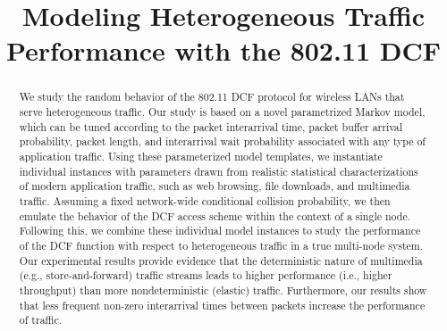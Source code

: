 \documentclass[conference]{IEEEtran}
\begin{document}
\title{Modeling Heterogeneous Traffic Performance with the 802.11 DCF}

\author{
}

\maketitle

\begin{abstract}
We study the random behavior of the 802.11 DCF protocol for wireless LANs that serve heterogeneous traffic. Our study is based on a novel parametrized Markov model, which can be tuned according to the packet interarrival time, packet buffer arrival probability, packet length, and interarrival wait probability associated with any type of application traffic. Using these parameterized model templates, we instantiate individual instances with parameters drawn from realistic statistical characterizations of modern application traffic, such as web browsing, file downloads, and multimedia traffic. Assuming a fixed network-wide conditional collision probability, we then emulate the behavior of the DCF access scheme within the context of a single node. Following this, we combine these individual model instances to study the performance of the DCF function with respect to heterogeneous traffic in a true multi-node system. Our experimental results provide evidence that the deterministic nature of multimedia (e.g., store-and-forward) traffic streams leads to higher performance (i.e., higher throughput) than more nondeterministic (elastic) traffic. Furthermore, our results show that less frequent non-zero interarrival times between packets increase the performance of traffic.
\end{abstract}

\begin{IEEEkeywords}
\end{IEEEkeywords}

\IEEEpeerreviewmaketitle
\end{document}
